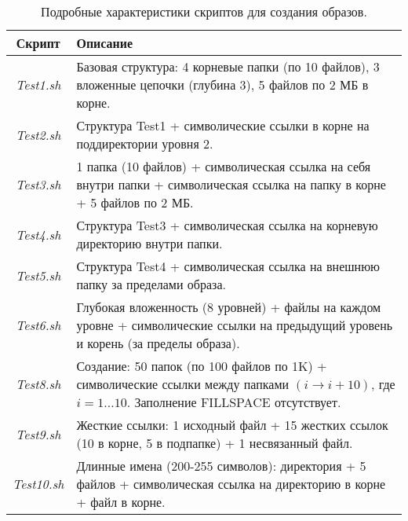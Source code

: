 \begin{table}[htbp]
	\renewcommand{\arraystretch}{1.5}
	\centering
	\begin{tabular}{|c|p{10cm}|}
		\hline
		\textbf{Скрипт} & \textbf{Описание} \\
		\hline
		\textit{Test1.sh} & Базовая структура: 4 корневые папки (по 10 файлов), 3 вложенные цепочки (глубина 3), 5 файлов по 2 МБ в корне.\\
        \hline
        \textit{Test2.sh} & Структура Test1 + символические ссылки в корне на поддиректории уровня 2.\\
        \hline
        \textit{Test3.sh} & 1 папка (10 файлов) + символическая ссылка на себя внутри папки + символическая ссылка на папку в корне + 5 файлов по 2 МБ.\\
        \hline
        \textit{Test4.sh} & Структура Test3 + символическая ссылка на корневую директорию внутри папки. \\
        \hline
        \textit{Test5.sh} & Структура Test4 + символическая ссылка на внешнюю папку за пределами образа. \\
        \hline
        \textit{Test6.sh} & Глубокая вложенность (8 уровней) + файлы на каждом уровне + символические ссылки на предыдущий уровень и корень (за пределы образа). \\
        \hline
        \textit{Test8.sh} & Создание: 50 папок (по 100 файлов по 1K) + символические ссылки между папками $(i\rightarrow i+10)$, где $i=1...10$. Заполнение FILLSPACE отсутствует.\\
        \hline
        \textit{Test9.sh} & Жесткие ссылки: 1 исходный файл + 15 жестких ссылок (10 в корне, 5 в подпапке) + 1 несвязанный файл.\\
        \hline
        \textit{Test10.sh} & Длинные имена (200-255 символов): директория + 5 файлов + символическая ссылка на директорию в корне + файл в корне.\\
        \hline
	\end{tabular}
	\caption{Подробные характеристики скриптов для создания образов.}
	\label{ext:tab:test_detail}
\end{table}

\newpage
